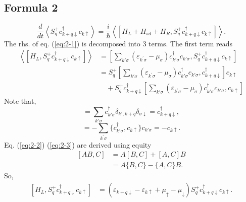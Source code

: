\documentclass[11pt,a4paper]{article}
\begin{document}
\subsection{Formula 2}
\begin{equation}
\frac{d}{d t}\left\langle S_{q}^{+} c_{k+q \downarrow}^{\dagger} c_{k \uparrow}\right\rangle=\frac{i}{\hbar}\left\langle\left[H_{L}+H_{s d}+H_{R}, S_{q}^{+} c_{k+q \downarrow}^{\dagger} c_{k \uparrow}\right]\right\rangle.
\label{eq:2-1}
\end{equation}
The rhs. of eq. (\ref{eq:2-1}) is decomposed into 3 terms. The first term reads
\begin{equation}
\begin{split}
\left\langle\left[H_{L}, S_{q}^{+} c_{k+q \downarrow}^{\dagger} c_{k \uparrow}\right]\right\rangle &= [\sum_{k'\sigma}\left(\varepsilon_{k^{\prime}\sigma}-\mu_{\sigma}\right) c_{k' \sigma}^{\dagger} c_{k' \sigma}, S_{q}^{+} c_{k+q \downarrow}^{\dagger} c_{k \uparrow}] \\
&= S_{q}^{+} [\sum_{k'\sigma}\left(\varepsilon_{k^{\prime}\sigma}-\mu_{\sigma}\right) c_{k' \sigma}^{\dagger} c_{k' \sigma}, c_{k+q \downarrow}^{\dagger}]c_{k \uparrow} \\
&\quad + S_{q}^{+}c_{k+q \downarrow}^{\dagger}[\sum_{k'\sigma}\left(\varepsilon_{k^{\prime}\sigma}-\mu_{\sigma}\right) c_{k' \sigma}^{\dagger} c_{k' \sigma}, c_{k \uparrow}]
\end{split}
\end{equation}
Note that,
\begin{equation}
[\sum_{k^{\prime} \sigma} c_{k^{\prime} \sigma}^{\dag} c_{k^{\prime} \sigma}, c_{k+q \downarrow}^{\dagger}] = \sum_{k'\sigma} c_{k'\sigma}^{\dag}\delta_{k',k+q}\delta_{\sigma\downarrow} = c_{k+q\downarrow}^{\dag},
\label{eq:2-2}
\end{equation}
\begin{equation}
[\sum_{k^{\prime} \sigma} c_{k^{\prime} \sigma}^{\dag} c_{k^{\prime} \sigma}, c_{k \uparrow}] = - \sum_{k^{\prime} \sigma} \{c_{k'\sigma}^{\dag}, c_{k\uparrow}\}c_{k'\sigma} = - c_{k\uparrow}.
\label{eq:2-3}
\end{equation}
Eq. (\ref{eq:2-2}) (\ref{eq:2-3}) are derived using equity
\begin{equation}
\begin{split}
[AB, C] &= A[B, C] + [A, C]B \\
&= A\{B, C\} - \{A, C\}B.
\end{split}
\end{equation}
So,
\begin{equation}
\begin{split}
\left[H_{L}, S_{q}^{+} c_{k+q \downarrow}^{\dagger} c_{k \uparrow}\right] &= \left(\varepsilon_{k+q \downarrow}-\varepsilon_{k \uparrow}+\mu_{\uparrow}-\mu_{\downarrow}\right)S_{q}^{+} c_{k+q \downarrow}^{\dagger} c_{k \uparrow}.
\end{split}
\label{eq:1-0}
\end{equation}
\end{document}
